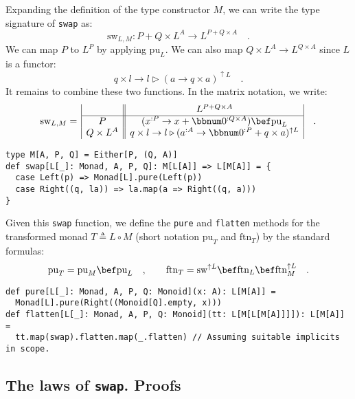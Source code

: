 Expanding the definition of the type constructor $M$, we can write
the type signature of \lstinline!swap! as: 
\[
\text{sw}_{L,M}:P+Q\times L^{A}\rightarrow L^{P+Q\times A}\quad.
\]
We can map $P$ to $L^{P}$ by applying $\text{pu}_{L}$. We can also
map $Q\times L^{A}\rightarrow L^{Q\times A}$ since $L$ is a functor:
\[
q\times l\rightarrow l\triangleright\left(a\rightarrow q\times a\right)^{\uparrow L}\quad.
\]
 It remains to combine these two functions. In the matrix notation,
we write:
\begin{equation}
\text{sw}_{L,M}=\,\begin{array}{|c||c|}
 & L^{P+Q\times A}\\
\hline P & (x^{:P}\rightarrow x+\bbnum 0^{:Q\times A})\bef\text{pu}_{L}\\
Q\times L^{A} & q\times l\rightarrow l\triangleright(a^{:A}\rightarrow\bbnum 0^{:P}+q\times a)^{\uparrow L}
\end{array}\quad.\label{eq:single-valued-monad-def-of-swap}
\end{equation}
\begin{lstlisting}
type M[A, P, Q] = Either[P, (Q, A)]
def swap[L[_]: Monad, A, P, Q]: M[L[A]] => L[M[A]] = {
  case Left(p) => Monad[L].pure(Left(p))
  case Right((q, la)) => la.map(a => Right((q, a)))
}
\end{lstlisting}

Given this \lstinline!swap! function, we define the \lstinline!pure!
and \lstinline!flatten! methods for the transformed monad $T\triangleq L\circ M$
(short notation $\text{pu}_{T}$ and $\text{ftn}_{T}$) by the standard
formulas:
\[
\text{pu}_{T}=\text{pu}_{M}\bef\text{pu}_{L}\quad,\quad\quad\text{ftn}_{T}=\text{sw}^{\uparrow L}\bef\text{ftn}_{L}\bef\text{ftn}_{M}^{\uparrow L}\quad.
\]
\begin{lstlisting}
def pure[L[_]: Monad, A, P, Q: Monoid](x: A): L[M[A]] =
  Monad[L].pure(Right((Monoid[Q].empty, x)))
def flatten[L[_]: Monad, A, P, Q: Monoid](tt: L[M[L[M[A]]]]): L[M[A]] =
  tt.map(swap).flatten.map(_.flatten) // Assuming suitable implicits in scope.
\end{lstlisting}


\subsection{The laws of \texttt{swap}. Proofs}

